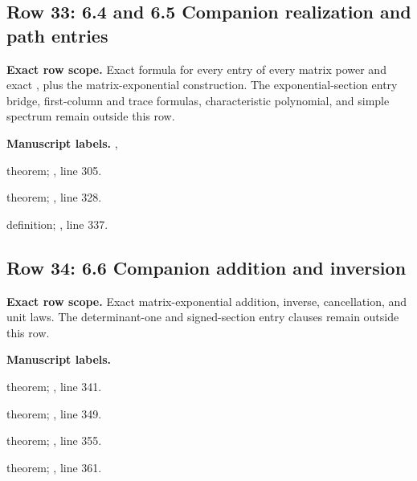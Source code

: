 \subsection{Row 33: 6.4 and 6.5 Companion realization and path entries}
\label{row:33}
\textbf{Exact row scope.} Exact formula for every entry of every matrix power and exact , plus the matrix-exponential construction. The exponential-section entry bridge, first-column and trace formulas, characteristic polynomial, and simple spectrum remain outside this row.\par\smallskip
\textbf{Manuscript labels.} , \par\smallskip
{\small{}\par}
{\footnotesize\color{muted}theorem; , line 305.\par}\smallskip
{\small{}\par}
{\footnotesize\color{muted}theorem; , line 328.\par}\smallskip
{\small{}\par}
{\footnotesize\color{muted}definition; , line 337.\par}\smallskip
{}
\subsection{Row 34: 6.6 Companion addition and inversion}
\label{row:34}
\textbf{Exact row scope.} Exact matrix-exponential addition, inverse, cancellation, and unit laws. The determinant-one and signed-section entry clauses remain outside this row.\par\smallskip
\textbf{Manuscript labels.} \par\smallskip
{\small{}\par}
{\footnotesize\color{muted}theorem; , line 341.\par}\smallskip
{\small{}\par}
{\footnotesize\color{muted}theorem; , line 349.\par}\smallskip
{\small{}\par}
{\footnotesize\color{muted}theorem; , line 355.\par}\smallskip
{\small{}\par}
{\footnotesize\color{muted}theorem; , line 361.\par}\smallskip
{}
